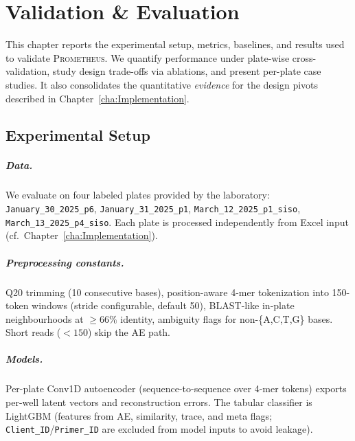 
%

\chapter{Validation \& Evaluation}
\label{cha:Evaluation}

This chapter reports the experimental setup, metrics, baselines, and results used to validate \textsc{Prometheus}. We quantify performance under plate-wise cross-validation, study design trade-offs via ablations, and present per-plate case studies. It also consolidates the quantitative \emph{evidence} for the design pivots described in Chapter~\ref{cha:Implementation}.

\section{Experimental Setup}
\label{sec:exp_setup}
\paragraph{Data.}
We evaluate on four labeled plates provided by the laboratory:
\texttt{January\_30\_2025\_p6},
\texttt{January\_31\_2025\_p1},
\texttt{March\_12\_2025\_p1\_siso},
\texttt{March\_13\_2025\_p4\_siso}.
Each plate is processed independently from Excel input (cf.~Chapter~\ref{cha:Implementation}).

\paragraph{Preprocessing constants.}
Q20 trimming (10 consecutive bases), position-aware 4-mer tokenization into 150-token windows (stride configurable, default 50), BLAST-like in-plate neighbourhoods at $\geq 66\%$ identity, ambiguity flags for non-\{A,C,T,G\} bases. Short reads ($<150$) skip the AE path.

\paragraph{Models.}
Per-plate Conv1D autoencoder (sequence-to-sequence over 4-mer tokens) exports per-well latent vectors and reconstruction errors. The tabular classifier is LightGBM (features from AE, similarity, trace, and meta flags; \texttt{Client\_ID}/\texttt{Primer\_ID} are excluded from model inputs to avoid leakage).


